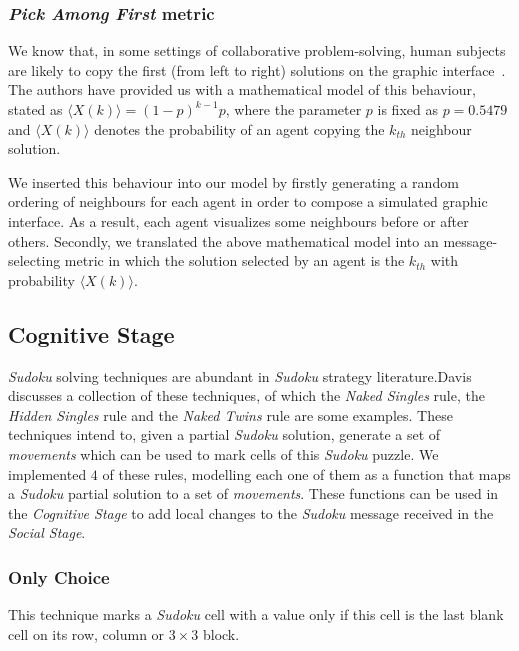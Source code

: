 \documentclass[letterpaper]{article}
\begin{document}
\subsubsection{{\em Pick Among First} metric}

We know that, in some settings of collaborative problem-solving, human subjects are likely to copy the first (from left to right) solutions on the graphic interface~\cite{farenzena:collabem}. The authors have provided us with a mathematical model of this behaviour, stated as $\langle X(k)\rangle = (1-p)^{k-1}p$, where the parameter $p$ is fixed as $p = 0.5479$ and $\langle X(k)\rangle$ denotes the probability of an agent copying the $k_{th}$ neighbour solution.

We inserted this behaviour into our model by firstly generating a random ordering of neighbours for each agent in order to compose a simulated graphic interface. As a result, each agent visualizes some neighbours before or after others. Secondly, we translated the above mathematical model into an message-selecting metric in which the solution selected by an agent is the $k_{th}$ with probability $\langle X(k)\rangle$.

\subsection{Cognitive Stage}

{\em Sudoku} solving techniques are abundant in {\em Sudoku} strategy literature.Davis ~\cite{davis:mathsudoku} discusses a collection of these techniques, of which the {\em Naked Singles} rule, the {\em Hidden Singles} rule and the {\em Naked Twins} rule are some examples. These techniques intend to, given a partial {\em Sudoku} solution, generate a set of {\em movements} which can be used to mark cells of this {\em Sudoku} puzzle. We implemented $4$ of these rules, modelling each one of them as a function that maps a {\em Sudoku} partial solution to a set of {\em movements}. These functions can be used in the {\em Cognitive Stage} to add local changes to the {\em Sudoku} message received in the {\em Social Stage}.

\subsubsection{Only Choice}

This technique marks a {\em Sudoku} cell with a value only if this cell is the last blank cell on its row, column or $3 \times 3$ block.
\end{document}

